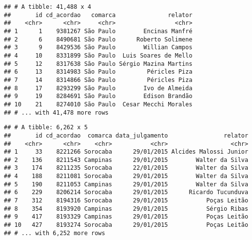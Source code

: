 \documentclass[]{book}
\newenvironment{Shaded}{\begin{snugshade}}{\end{snugshade}}
\newcommand{\KeywordTok}[1]{\textcolor[rgb]{0.13,0.29,0.53}{\textbf{{#1}}}}
\newcommand{\DataTypeTok}[1]{\textcolor[rgb]{0.13,0.29,0.53}{{#1}}}
\newcommand{\DecValTok}[1]{\textcolor[rgb]{0.00,0.00,0.81}{{#1}}}
\newcommand{\StringTok}[1]{\textcolor[rgb]{0.31,0.60,0.02}{{#1}}}
\newcommand{\NormalTok}[1]{{#1}}
\begin{document}
\begin{verbatim}
## # A tibble: 41,488 x 4
##       id cd_acordao   comarca               relator
##    <chr>      <chr>     <chr>                 <chr>
## 1      1    9381267 São Paulo        Encinas Manfré
## 2      6    8490681 São Paulo      Roberto Solimene
## 3      9    8429536 São Paulo        Willian Campos
## 4     10    8331899 São Paulo  Luis Soares de Mello
## 5     12    8317638 São Paulo Sérgio Mazina Martins
## 6     13    8314983 São Paulo         Péricles Piza
## 7     14    8314866 São Paulo         Péricles Piza
## 8     17    8293299 São Paulo        Ivo de Almeida
## 9     19    8284691 São Paulo        Edison Brandão
## 10    21    8274010 São Paulo  Cesar Mecchi Morales
## # ... with 41,478 more rows
\end{verbatim}

\begin{Shaded}
\end{Shaded}

\begin{verbatim}
## # A tibble: 6,262 x 5
##       id cd_acordao  comarca data_julgamento                relator
##    <chr>      <chr>    <chr>           <chr>                  <chr>
## 1     33    8221266 Sorocaba      29/01/2015 Alcides Malossi Junior
## 2    136    8211543 Campinas      29/01/2015        Walter da Silva
## 3    174    8211235 Sorocaba      22/01/2015        Walter da Silva
## 4    188    8211081 Sorocaba      29/01/2015        Walter da Silva
## 5    190    8211053 Campinas      29/01/2015        Walter da Silva
## 6    229    8206214 Sorocaba      29/01/2015      Ricardo Tucunduva
## 7    312    8194316 Sorocaba      29/01/2015           Poças Leitão
## 8    354    8193920 Campinas      29/01/2015           Sérgio Ribas
## 9    417    8193329 Campinas      29/01/2015           Poças Leitão
## 10   427    8193274 Sorocaba      29/01/2015           Poças Leitão
## # ... with 6,252 more rows
\end{verbatim}
\end{document}
